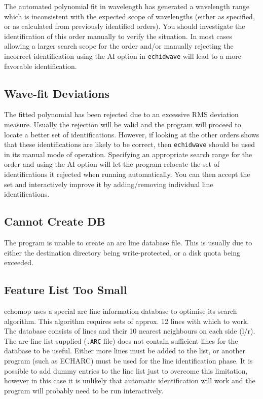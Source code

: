 \documentclass[twoside,11pt]{article}
\newcommand{\htmlref}[2]{#1}
\newcommand{\xref}[3]{#1}
\newcommand{\xlabel}[1]{}
\renewcommand{\_}{\texttt{\symbol{95}}}
\newcommand{\mlabel}[1]{\xlabel{#1}\label{#1}}
\begin{document}
The automated polynomial fit in wavelength has generated a wavelength
range which is inconsistent with the expected scope of wavelengths
(either as specified, or as calculated from previously identified orders).
You should investigate the identification of
this order manually to verify the situation.
In most cases allowing a larger search scope for the order and/or
manually rejecting the incorrect identification using the AI option in
\htmlref{{\tt ech\_idwave}}{ech_idwave} will
lead to a more favorable identification.

\subsection{\mlabel{wave_fit_deviations} Wave-fit Deviations}

The fitted polynomial has been rejected due to an excessive RMS
deviation measure. Usually the rejection will be valid and the program
will proceed to locate a better set of identifications. However, if
looking at the other orders shows that these
identifications are likely to be correct, then
\htmlref{{\tt ech\_idwave}}{ech_idwave}
should be used in its manual mode of operation. Specifying an
appropriate search range for the  order and using the AI option will let
the program relocate the set of identifications it rejected when running
automatically. You can then accept the set and interactively
improve it by adding/removing individual line identifications.

\subsection{\mlabel{cannot_create_db} Cannot Create DB}

The program is unable to create an arc line database file.
This is usually due to either the destination directory being
write-protected, or a disk quota being exceeded.

\subsection{\mlabel{feature_list_too_small} Feature List Too Small}

{\sc echomop} uses a special arc line information database to optimise its
search algorithm. This algorithm requires sets of approx. 12 lines with
which to work. The database consists of lines and their 10 nearest
neighbours on each side (l/r).  The arc-line list supplied (\texttt{.ARC} file)
does not contain sufficient lines for the database to be useful.
Either more lines must be added to the list,  or another program
(such as \xref{ECHARC}{sun86}{ECHARC}) must be used for the line
identification phase. It is
possible to add dummy entries to the line list just to overcome this
limitation, however in this case it is unlikely that automatic
identification will work and the program will probably need to be run
interactively.
\end{document}

